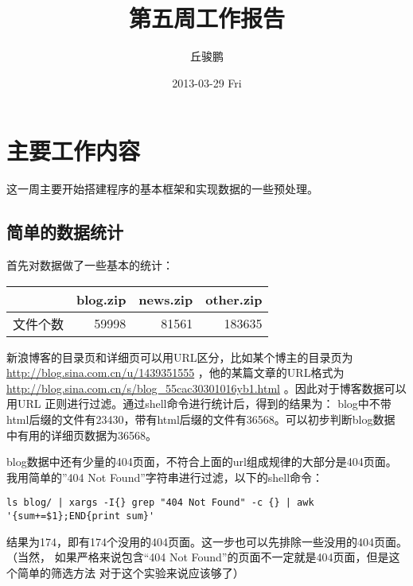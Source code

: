 \documentclass[a4paper]{article}
\title{第五周工作报告}
\author{丘骏鹏}
\date{2013-03-29 Fri}
\begin{document}
\maketitle



\section{主要工作内容}
\label{sec-1}

这一周主要开始搭建程序的基本框架和实现数据的一些预处理。
\subsection{简单的数据统计}
\label{sec-1-1}

首先对数据做了一些基本的统计：

\begin{center}
\begin{tabular}{lrrr}
           &  blog.zip  &  news.zip  &  other.zip  \\
\hline
 文件个数  &     59998  &     81561  &     183635  \\
\end{tabular}
\end{center}



新浪博客的目录页和详细页可以用URL区分，比如某个博主的目录页为
\href{http://blog.sina.com.cn/u/1439351555}{http://blog.sina.com.cn/u/1439351555}
，他的某篇文章的URL格式为\\
\href{http://blog.sina.com.cn/s/blog_55cac30301016yb1.html}{http://blog.sina.com.cn/s/blog\_55cac30301016yb1.html}
。因此对于博客数据可以用URL
正则进行过滤。通过shell命令进行统计后，得到的结果为：
blog中不带html后缀的文件有23430，带有html后缀的文件有36568。可以初步判断blog数据
中有用的详细页数据为36568。

blog数据中还有少量的404页面，不符合上面的url组成规律的大部分是404页面。
我用简单的''404 Not Found''字符串进行过滤，以下的shell命令：

\lstset{extendedchars=false,basicstyle=\ttfamily\footnotesize,escapechar=`,breaklines,language=shell}
\begin{lstlisting}
ls blog/ | xargs -I{} grep "404 Not Found" -c {} | awk '{sum+=$1};END{print sum}'
\end{lstlisting}
结果为174，即有174个没用的404页面。这一步也可以先排除一些没用的404页面。（当然，
如果严格来说包含“404 Not Found”的页面不一定就是404页面，但是这个简单的筛选方法
对于这个实验来说应该够了）
\end{document}
